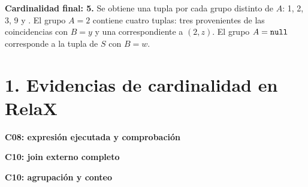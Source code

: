 \textbf{Cardinalidad final: 5.} Se obtiene una tupla por cada grupo distinto de $A$: 1, 2, 3, 9 y \nulo{}. El grupo $A=2$ contiene cuatro tuplas: tres provenientes de las coincidencias con $B=y$ y una correspondiente a $(2,z)$. El grupo $A=\texttt{null}{}$ corresponde a la tupla de $S$ con $B=w$.

\clearpage

\section*{1. Evidencias de cardinalidad en RelaX}

\textbf{C08: expresión ejecutada y comprobación}



\begin{center}
\begin{minipage}{.48\linewidth}
\end{minipage}
\hfill
\begin{minipage}{.48\linewidth}
\end{minipage}
\end{center}

\textbf{C10: join externo completo}



\begin{center}
\begin{minipage}{.48\linewidth}
\end{minipage}
\hfill
\begin{minipage}{.48\linewidth}
\end{minipage}
\end{center}

\textbf{C10: agrupación y conteo}

\begin{center}
\begin{minipage}{.48\linewidth}
\end{minipage}
\hfill
\begin{minipage}{.48\linewidth}
\end{minipage}
\end{center}